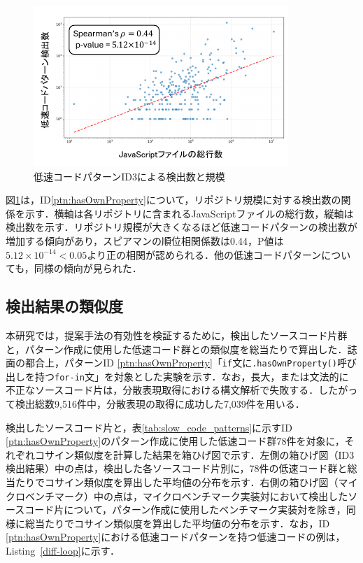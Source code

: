 \documentclass[submit,techrep,noauthor]{ipsj}
\begin{document}
\begin{figure}[t]
    \centering
    \includegraphics[width=1.0\linewidth]{./Noguchi_fig/log_ID3_spia.pdf}
    \caption{低速コードパターンID3による検出数と規模}
    \label{fig:plot_id3}
\end{figure}

図\ref{fig:plot_id3}は，ID\ref{ptn:hasOwnProperty}について，リポジトリ規模に対する検出数の関係を示す．横軸は各リポジトリに含まれるJavaScriptファイルの総行数，縦軸は検出数を示す．リポジトリ規模が大きくなるほど低速コードパターンの検出数が増加する傾向があり，スピアマンの順位相関係数は0.44，P値は\(5.12 \times 10^{-14} < 0.05\)より正の相関が認められる．他の低速コードパターンについても，同様の傾向が見られた．

\subsection{検出結果の類似度}

本研究では，提案手法の有効性を検証するために，検出したソースコード片群と，パターン作成に使用した低速コード群との類似度を総当たりで算出した．誌面の都合上，パターンID \ref{ptn:hasOwnProperty}「\texttt{if}文に\texttt{.hasOwnProperty()}呼び出しを持つ\texttt{for-in}文」を対象とした実験を示す．なお，長大，または文法的に不正なソースコード片は，分散表現取得における構文解析で失敗する．したがって検出総数9,516件中，分散表現の取得に成功した7,039件を用いる．


検出したソースコード片と，表\ref{tab:slow_code_patterns}に示すID \ref{ptn:hasOwnProperty}のパターン作成に使用した低速コード群78件を対象に，それぞれコサイン類似度を計算した結果を箱ひげ図で示す．左側の箱ひげ図（ID3検出結果）中の点は，検出した各ソースコード片別に，78件の低速コード群と総当たりでコサイン類似度を算出した平均値の分布を示す．右側の箱ひげ図（マイクロベンチマーク）中の点は，マイクロベンチマーク実装対において検出したソースコード片について，パターン作成に使用したベンチマーク実装対を除き，同様に総当たりでコサイン類似度を算出した平均値の分布を示す．なお，ID \ref{ptn:hasOwnProperty}における低速コードパターンを持つ低速コードの例は，Listing~\ref{diff-loop}に示す．
\end{document}
